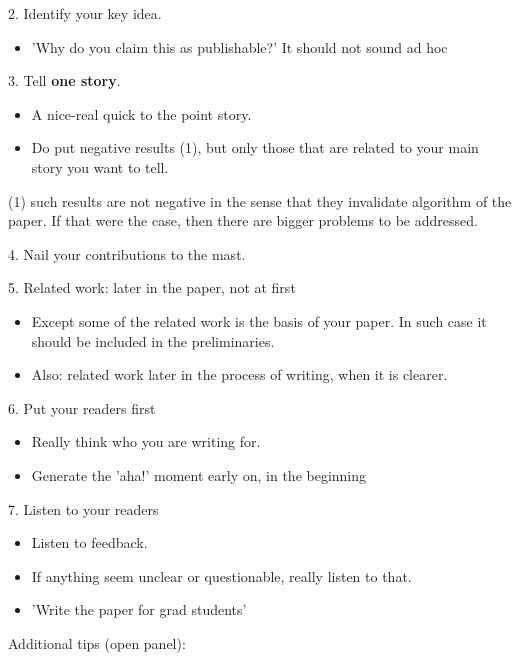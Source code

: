 \documentclass[12pt, english]{article}
\begin{document}
2. Identify your key idea.
\begin{itemize}
    \item 'Why do you claim this as publishable?' It should not sound ad hoc
    \end{itemize}

3. Tell \textbf{one story}.
\begin{itemize}
    \item A nice-real quick to the point story.
    \item Do put negative results (1), but only those that are related to your main story you want to tell.
    \end{itemize}

(1) such results are not negative in the sense that they invalidate algorithm of the paper. If that were the case, then there are bigger problems to be addressed.

4. Nail your contributions to the mast.

5. Related work: later in the paper, not at first
\begin{itemize}
  \item Except some of the related work is the basis of your paper. In such case it should be included in the preliminaries.
  \item Also: related work later in the process of writing, when it is clearer.
  \end{itemize}

6. Put your readers first
\begin{itemize}
  \item Really think who you are writing for.
  \item Generate the 'aha!' moment early on, in the beginning
  \end{itemize}

7. Listen to your readers
\begin{itemize}
  \item Listen to feedback.
  \item If anything seem unclear or questionable, really listen to that.
  \item 'Write the paper for grad students'
  \end{itemize}

Additional tips (open panel):
\end{document}
